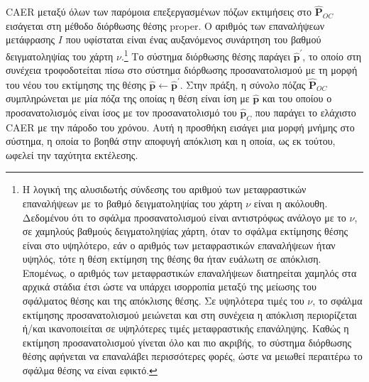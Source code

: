 CAER μεταξύ όλων των παρόμοια επεξεργασμένων πόζων εκτιμήσεις στο
$\hat{\bm{P}}_{OC}$ εισάγεται στη μέθοδο διόρθωσης θέσης proper. Ο αριθμός των
επαναλήψεων μετάφρασης $I$ που υφίσταται είναι ένας αυξανόμενος συνάρτηση του
βαθμού δειγματοληψίας του χάρτη $\nu$.\footnote{Η λογική της αλυσιδωτής
σύνδεσης του αριθμού των μεταφραστικών επαναλήψεων με το βαθμό δειγματοληψίας
του χάρτη $\nu$ είναι η ακόλουθη.  Δεδομένου ότι το σφάλμα προσανατολισμού
είναι αντιστρόφως ανάλογο με το $\nu$, σε χαμηλούς βαθμούς δειγματοληψίας
χάρτη, όταν το σφάλμα εκτίμησης θέσης είναι στο υψηλότερο, εάν ο αριθμός των
μεταφραστικών επαναλήψεων ήταν υψηλός, τότε η θέση εκτίμηση της θέσης θα ήταν
ευάλωτη σε απόκλιση. Επομένως, ο αριθμός των μεταφραστικών επαναλήψεων
διατηρείται χαμηλός στα αρχικά στάδια έτσι ώστε να υπάρχει ισορροπία μεταξύ της
μείωσης του σφάλματος θέσης και της απόκλισης θέσης. Σε υψηλότερα τιμές του
$\nu$, το σφάλμα εκτίμησης προσανατολισμού μειώνεται και στη συνέχεια η
απόκλιση περιορίζεται ή/και ικανοποιείται σε υψηλότερες τιμές μεταφραστικής
επανάληψης.  Καθώς η εκτίμηση προσανατολισμού γίνεται όλο και πιο ακριβής, το
σύστημα διόρθωσης θέσης αφήνεται να επαναλάβει περισσότερες φορές, ώστε να
μειωθεί περαιτέρω το σφάλμα θέσης να είναι εφικτό.} Το σύστημα διόρθωσης θέσης
παράγει $\hat{\bm{p}}^\prime$, το οποίο στη συνέχεια τροφοδοτείται πίσω στο
σύστημα διόρθωσης προσανατολισμού με τη μορφή του νέου του εκτίμησης της θέσης
$\hat{\bm{p}} \leftarrow \hat{\bm{p}}^\prime$. Στην πράξη, η σύνολο πόζας
$\hat{\bm{P}}_{OC}$ συμπληρώνεται με μία πόζα της οποίας η θέση είναι ίση με
$\hat{\bm{p}}$ και του οποίου ο προσανατολισμός είναι ίσος με τον
προσανατολισμό του $\hat{\bm{p}}_C$ που παράγει το ελάχιστο CAER με την πάροδο
του χρόνου. Αυτή η προσθήκη εισάγει μια μορφή μνήμης στο σύστημα, η οποία το
βοηθά στην αποφυγή απόκλιση και η οποία, ως εκ τούτου, ωφελεί την ταχύτητα
εκτέλεσης.
